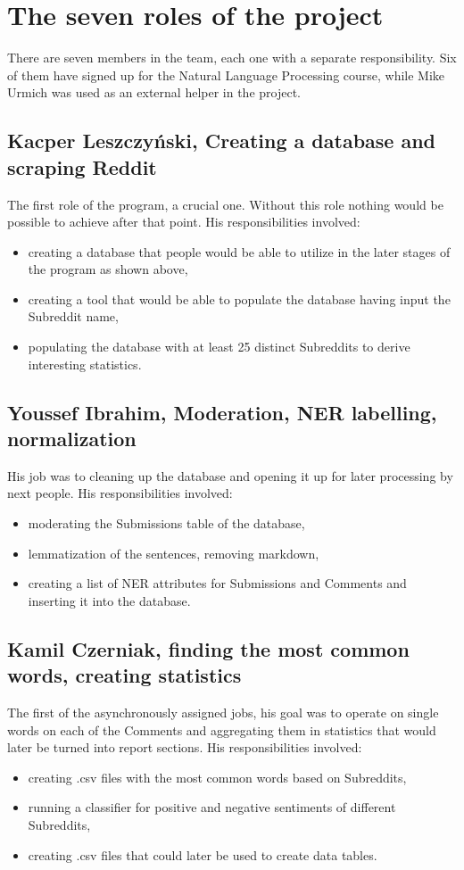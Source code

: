 \documentclass[openany]{article}
\begin{document}
\section{The seven roles of the project}
There are seven members in the team, each one with a separate responsibility. Six of them have signed up for the Natural Language Processing course, while Mike Urmich was used as an external helper in the project.

\subsection{Kacper Leszczyński, Creating a database and scraping Reddit}
The first role of the program, a crucial one. Without this role nothing would be possible to achieve after that point. His responsibilities involved:
\begin{itemize}
	\item creating a database that people would be able to utilize in the later stages of the program as shown above,
	\item creating a tool that would be able to populate the database having input the Subreddit name,
	\item populating the database with at least 25 distinct Subreddits to derive interesting statistics.
\end{itemize}
\subsection{Youssef Ibrahim, Moderation, NER labelling, normalization}
His job was to cleaning up the database and opening it up for later processing by next people. His responsibilities involved:
\begin{itemize}
	\item moderating the Submissions table of the database,
	\item lemmatization of the sentences, removing markdown,
	\item creating a list of NER attributes for Submissions and Comments and inserting it into the database.
\end{itemize}
\subsection{Kamil Czerniak, finding the most common words, creating statistics}
The first of the asynchronously assigned jobs, his goal was to operate on single words on each of the Comments and aggregating them in statistics that would later be turned into report sections. His responsibilities involved:
\begin{itemize}
	\item creating .csv files with the most common words based on Subreddits,
	\item running a classifier for positive and negative sentiments of different Subreddits,
	\item creating .csv files that could later be used to create data tables.
\end{itemize}
\end{document}
